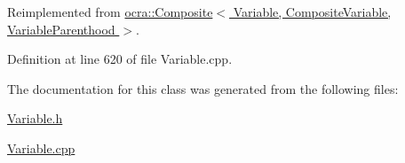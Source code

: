 Reimplemented from \hyperlink{classocra_1_1Composite_a93b8f85ae3267400fdddad9078945e07}{ocra\+::\+Composite$<$ Variable, Composite\+Variable, Variable\+Parenthood $>$}.



Definition at line 620 of file Variable.\+cpp.



The documentation for this class was generated from the following files\+:\begin{DoxyCompactItemize}
\item 
\hyperlink{Variable_8h}{Variable.\+h}\item 
\hyperlink{Variable_8cpp}{Variable.\+cpp}\end{DoxyCompactItemize}
